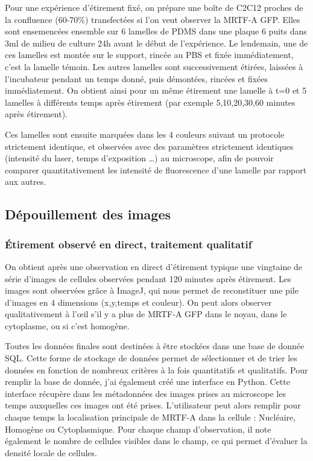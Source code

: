 \documentclass{report}
\begin{document}
	Pour une expérience d'étirement fixé, on prépare une boîte de C2C12 proches de la confluence (60-70\%) transfectées si l'on veut observer la MRTF-A GFP. Elles sont ensemencées ensemble sur 6 lamelles de PDMS dans une plaque 6 puits dans 3ml de milieu de culture 24h avant le début de l'expérience. Le lendemain, une de ces lamelles est montée sur le support, rincée au PBS et fixée immédiatement, c'est la lamelle témoin. Les autres lamelles sont successivement étirées, laissées à l'incubateur pendant un temps donné, puis démontées, rincées et fixées immédiatement. On obtient ainsi pour un même étirement une lamelle à t=0 et 5 lamelles à différents temps après étirement (par exemple 5,10,20,30,60 minutes après étirement). 
	
	Ces lamelles sont ensuite marquées dans les 4 couleurs suivant un protocole strictement identique, et observées avec des paramètres strictement identiques (intensité du laser, temps d'exposition \dots) au microscope, afin de pouvoir comparer quantitativement les intensité de fluorescence d'une lamelle par rapport aux autres. 
	

	\subsection{Dépouillement des images}
	\subsubsection{\'Etirement observé en direct, traitement qualitatif}
	On obtient après une observation en direct d'étirement typique une vingtaine de série d'images de cellules observées pendant 120 minutes après étirement. 
	Les images sont observées grâce à ImageJ, qui nous permet de reconstituer une pile d'images en 4 dimensions (x,y,temps et couleur). On peut alors observer qualitativement à l'\oe il s'il y a plus de MRTF-A GFP dans le noyau, dans le cytoplasme, ou si c'est homogène. 
	
	Toutes les données finales sont destinées à être stockées dans une base de donnée SQL. Cette forme de stockage de données permet de sélectionner et de trier les données en fonction de nombreux critères à la fois quantitatifs et qualitatifs. Pour remplir la base de donnée, j'ai également créé une interface en Python. Cette interface récupère dans les métadonnées des images prises au microscope les temps auxquelles ces images ont été prises. L'utilisateur peut alors remplir pour chaque temps la localisation principale de MRTF-A dans la cellule : Nucléaire, Homogène ou Cytoplasmique. 
	Pour chaque champ d'observation, il note également le nombre de cellules visibles dans le champ, ce qui permet d'évaluer la densité locale de cellules. 
	
\end{document}
